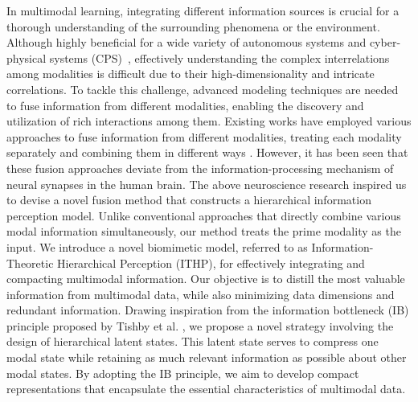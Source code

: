 \documentclass{article} %
\begin{document}
In multimodal learning, integrating different information sources is crucial for a thorough understanding of the surrounding phenomena or the environment. Although highly beneficial for a wide variety of autonomous systems and cyber-physical systems (CPS)~\cite{xue2017constructing}, effectively understanding the complex interrelations among modalities is difficult due to their high-dimensionality and intricate correlations\citep{yin2023survey}. To tackle this challenge, advanced modeling techniques are needed to fuse information from different modalities, enabling the discovery and utilization of rich interactions among them. Existing works have employed various approaches to fuse information from different modalities, treating each modality separately and combining them in different ways \citep{castro2019towards, rahman2020integrating}. However, it has been seen that these fusion approaches deviate from the information-processing mechanism of neural synapses in the human brain. The above neuroscience research inspired us to devise a novel fusion method that constructs a hierarchical information perception model. Unlike conventional approaches that directly combine various modal information simultaneously, our method treats the prime modality as the input. We introduce a novel biomimetic model, referred to as Information-Theoretic Hierarchical Perception (ITHP), for effectively integrating and compacting multimodal information. Our objective is to distill the most valuable information from multimodal data, while also minimizing data dimensions and redundant information. Drawing inspiration from the information bottleneck (IB) principle proposed by Tishby et al. \citep{tishby2000information}, we propose a novel strategy involving the design of hierarchical latent states. This latent state serves to compress one modal state while retaining as much relevant information as possible about other modal states. By adopting the IB principle, we aim to develop compact representations that encapsulate the essential characteristics of multimodal data.
\end{document}
